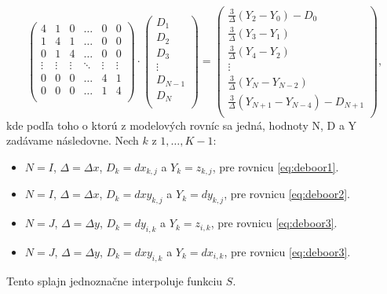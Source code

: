 \documentclass{rnthesis}
\begin{document}
\begin{equation} \label{eq:deboorM}
\begin{pmatrix}
4 & 1 & 0 & \hdots & 0 & 0\\
1 & 4 & 1 & \hdots & 0 & 0\\
0 & 1 & 4 & \hdots & 0 & 0\\
\vdots & \vdots & \vdots & \ddots & \vdots & \vdots\\
0 & 0 & 0 & \hdots & 4 & 1\\
0 & 0 & 0 & \hdots & 1 & 4\\
\end{pmatrix}
\cdot
\begin{pmatrix}
D_{1}\\
D_{2}\\
D_{3}\\
\vdots \\
D_{N-1}\\
D_{N}\\
\end{pmatrix}
=
\begin{pmatrix}
\frac{3}{\Delta}(Y_{2} - Y_{0}) - D_0\\
\frac{3}{\Delta}(Y_{3} - Y_{1})\\
\frac{3}{\Delta}(Y_{4} - Y_{2})\\
\vdots \\
\frac{3}{\Delta}(Y_{N} - Y_{N-2})\\
\frac{3}{\Delta}(Y_{N+1} - Y_{N-4}) - D_{N+1}\\
\end{pmatrix} \text{,}
\end{equation}
kde podľa toho o ktorú z modelových rovníc sa jedná, hodnoty N, D a Y zadávame následovne. Nech $k$ z ${1, \dots, K-1}$:
\begin{itemize}
	\item
	$N = I$, $\Delta = \Delta x$,  $D_k = dx_{k,j}$ a $Y_k = z_{k,j}$, pre rovnicu \ref{eq:deboor1}.
	\item
	$N = I$, $\Delta = \Delta x$,  $D_k = dxy_{k,j}$ a $Y_k = dy_{k,j}$, pre rovnicu \ref{eq:deboor2}.
	\item
	$N = J$, $\Delta = \Delta y$,  $D_k = dy_{i,k}$ a $Y_k = z_{i,k}$, pre rovnicu \ref{eq:deboor3}.
	\item
	$N = J$, $\Delta = \Delta y$,  $D_k = dxy_{i,k}$ a $Y_k = dx_{i,k}$, pre rovnicu \ref{eq:deboor3}.
\end{itemize}

Tento splajn jednoznačne interpoluje funkciu $S$.

\end{document}
